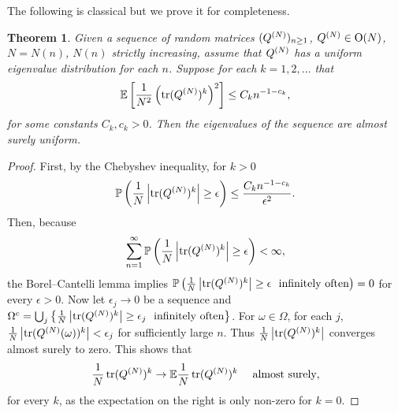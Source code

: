 \documentclass{amsart}
\newtheorem{theorem}{Theorem}[section]
\theoremstyle{definition}
\theoremstyle{remark}
\numberwithin{equation}{section}
\DeclareMathOperator{\tr}{tr}
\begin{document}
The following is classical but we prove it for completeness.

\begin{theorem}\label{t:var}
Given a sequence of random matrices $(Q^{(N)})_{n \geq 1}$, $Q^{(N)} \in \mathrm O(N)$, $N = N(n)$, $N(n)$ strictly increasing, assume that $Q ^{(N)}$ has a uniform eigenvalue distribution for each $n$.  Suppose for each $k=1,2,\ldots$ that
\begin{align}
\mathbb E \left[ \frac{1}{N^2}\left( \tr (Q\pp{N})^k \right)^2 \right] \leq C_k n^{-1-c_k},
\end{align}
for some constants $C_k,c_k > 0$.  Then the eigenvalues of the sequence are almost surely uniform.
\end{theorem}
\begin{proof}
First, by the Chebyshev inequality, for $k > 0$
\begin{align}
\mathbb P\left( \frac{1}{N}\left| \tr (Q\pp{N})^k \right| \geq \epsilon \right) \leq \frac{C_k n^{-1-c_k}}{\epsilon^2}.
\end{align}
Then, because
\begin{align}
\sum_{n = 1}^\infty \mathbb P\left( \frac{1}{N}\left| \tr (Q\pp{N})^k \right| \geq \epsilon \right) < \infty,
\end{align}
the Borel--Cantelli lemma implies $\mathbb P \left( \frac{1}{N}\left| \tr (Q\pp{N})^k \right| \geq \epsilon  ~ \text{ infinitely often} \right) = 0$ for every $\epsilon > 0$.  Now let $\epsilon_j \to 0$ be a sequence and $\Omega^c = \bigcup_j \left\{ \frac{1}{N}\left| \tr (Q\pp{N})^k \right| \geq \epsilon_j  ~ \text{ infinitely often} \right\}$.  For $\omega \in \Omega$, for each $j$, $\frac{1}{N}\left| \tr (Q\pp{N}(\omega))^k \right| < \epsilon_j$ for sufficiently large $n$.  Thus $\frac{1}{N}\left| \tr (Q\pp{N})^k \right|$ converges almost surely to zero.  This shows that
\begin{align}
  \frac{1}{N} \tr (Q\pp{N})^k \to  \mathbb E \frac{1}{N} \tr (Q\pp{N})^k~~~\text{ almost surely},
\end{align}
for every $k$, as the expectation on the right is only non-zero for $k = 0$.  


\end{proof}
\end{document}
